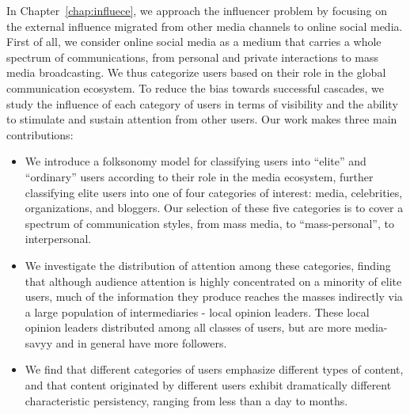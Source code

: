 \documentclass[phd,tocprelim]{cornell}
\begin{document}
In Chapter~\ref{chap:influece}, we approach the influencer problem by focusing on the external influence migrated from other media channels to online social media. First of all, we consider online social media as a medium that carries a whole spectrum of communications, from personal and private interactions to mass media broadcasting. We thus categorize users based on their role in the global communication ecosystem. To reduce the bias towards successful cascades, we study the influence of each category of users in terms of visibility and the ability to stimulate and sustain attention from other users. Our work makes three main contributions:
\begin{itemize}
\item We introduce a folksonomy model for classifying users into ``elite''
and ``ordinary'' users according to their role in the media ecosystem, further
classifying elite users into one of four categories of interest: media,
celebrities, organizations, and bloggers. Our selection of these five categories is to cover a spectrum of communication styles, from mass media, to ``mass-personal'', to interpersonal.
\item We investigate the distribution of attention among these categories, finding that although audience attention is
highly concentrated on a minority of elite users, much of the information they produce reaches the masses indirectly via a large population of intermediaries - local opinion leaders. These local opinion leaders distributed among all classes of users, but are more media-savyy and in general have more followers.
\item We find that different categories of users emphasize different types of content, and that content originated by different users exhibit dramatically different characteristic persistency, ranging from less than a day to months.
\end{itemize}





\end{document}
